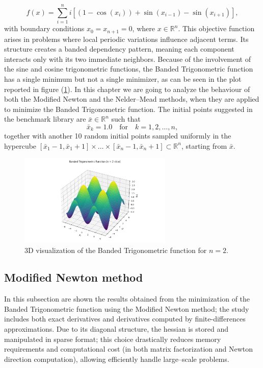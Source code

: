 \documentclass[a4paper,12pt]{article}
\begin{document}
	\[
	f(x) = \sum_{i=1}^{n} i \left[ (1 - \cos(x_i)) + \sin(x_{i-1}) - \sin(x_{i+1}) \right],
	\]
	with boundary conditions \( x_0 = x_{n+1} = 0 \), where \( x \in \mathbb{R}^n \). This objective function arises in problems where local periodic variations influence adjacent terms. Its structure creates a banded dependency pattern, meaning each component interacts only with its two immediate neighbors. Because of the involvement of the sine and cosine trigonometric functions, the Banded Trigonometric function has a single minimum but not a single minimizer, as can be seen in the plot reported in figure (\ref{fig:banded3D}). In this chapter we are going to analyze the behaviour of both the Modified Newton and the Nelder–Mead methods, when they are applied to minimize the Banded Trigonometric function.
	The initial points suggested in the benchmark library  are $\bar{x} \in \mathbb{R}^{n}$ such that
	\[
	\bar{x}_{k} = 1.0 \quad \text{for} \quad k = 1,2,\dots,n,		
	\]
	together with another 10 random initial points sampled uniformly in the hypercube $[\bar{x}_{1}-1,\bar{x}_{1}+1]\times\dots\times[\bar{x}_{n}-1,\bar{x}_{n}+1] \subset \mathbb{R}^{n}$, starting from $\bar{x}$.
	
		\begin{figure}[H]%
		\centering
		\includegraphics[width=0.65\textwidth]{../immagini/banded_3D.png}
		\caption{3D visualization of the Banded Trigonometric function for $n=2$.}
		\label{fig:banded3D}
	\end{figure}
	
	\newpage
	
	\subsection{Modified Newton method}
	In this subsection are shown the results obtained from the minimization of the Banded Trigonometric function using the Modified Newton method; the study includes both exact derivatives and derivatives computed by finite-differences approximations. Due to its diagonal structure, the hessian is stored and manipulated in sparse format; this choice drastically reduces memory requirements and computational cost (in both matrix factorization and Newton direction computation), allowing efficiently handle large--scale problems.
	
\end{document}
